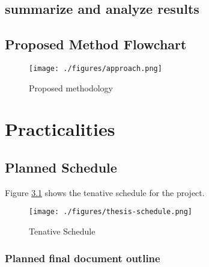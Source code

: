 \section{summarize and analyze results}


\section{Proposed Method Flowchart}
\begin{figure}
      \centering
      \texttt{[image: ./figures/approach.png]}
      \caption{Proposed methodology}
      \label{method-flowchart}
\end{figure}

\chapter{Practicalities}

\section{Planned Schedule}

Figure \ref{project-schedule} shows the tenative schedule for the project. 
\begin{landscape}

      \begin{figure}
            \centering
            \texttt{[image: ./figures/thesis-schedule.png]}
            \caption{Tenative Schedule}
            \label{project-schedule}
      \end{figure}

\end{landscape}
\subsection{Planned final document outline}

